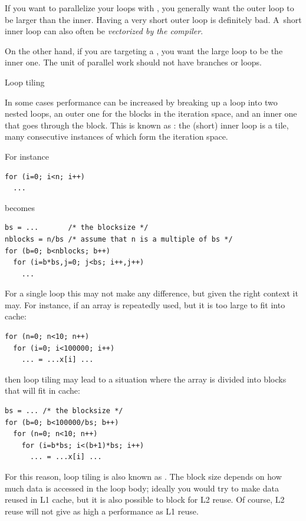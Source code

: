 %
If you want to parallelize your loops with , you
generally want the outer loop to be larger than the inner. Having a
very short outer loop is definitely bad. A~short inner loop can also
often be \emph{vectorized by the
  compiler}.

On the other hand, if you are targeting a , you want the
large loop to be the inner one. The unit of parallel work should not have branches
or loops.


 {Loop tiling}
\label{sec:loop-tiling}

In some cases performance can be increased by breaking up a loop into
two nested loops, an outer one for the blocks in the iteration space,
and an inner one that goes through the block. This is known as
: the (short) inner loop is a tile, many
consecutive instances of which form the iteration space.

For instance
\begin{verbatim}
for (i=0; i<n; i++)
  ...
\end{verbatim}
becomes
\begin{verbatim}
bs = ...       /* the blocksize */
nblocks = n/bs /* assume that n is a multiple of bs */
for (b=0; b<nblocks; b++)
  for (i=b*bs,j=0; j<bs; i++,j++)
    ...
\end{verbatim}
For a single loop this may not make any difference, but given the
right context it may. For instance, if an array is repeatedly used,
but it is too large to fit into cache:
\begin{verbatim}
for (n=0; n<10; n++)
  for (i=0; i<100000; i++)
    ... = ...x[i] ...

\end{verbatim}
then loop tiling may lead to a situation where the array is divided
into blocks that will fit in cache:
\begin{verbatim}
bs = ... /* the blocksize */
for (b=0; b<100000/bs; b++)
  for (n=0; n<10; n++)
    for (i=b*bs; i<(b+1)*bs; i++)
      ... = ...x[i] ...
\end{verbatim}
For this reason, loop tiling is also known as
. The block size depends on how much
data is accessed in the loop body; ideally you would try to make data
reused in L1 cache, but it is also possible to block for L2 reuse. Of
course, L2 reuse will not give as high a performance as L1 reuse.

